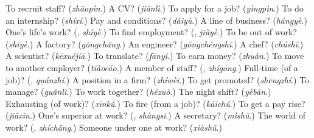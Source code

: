 \begin{tcolorbox}[breakable,colback=teal!4,colframe=teal!35!black,title={Before you move on}]
To recruit staff? (\emph{zhāopìn}.) A CV? (\emph{jiǎnlì}.) To apply for a job? (\emph{yìngpìn}.) To do an internship? (\emph{shíxí}.) Pay and conditions? (\emph{dàiyù}.) A line of business? (\emph{hángyè}.) One's life's work? (\textbf{}, \emph{shìyè}.) To find employment? (\textbf{}, \emph{jiùyè}.) To be out of work? (\emph{shīyè}.) A factory? (\emph{gōngchǎng}.) An engineer? (\emph{gōngchéngshī}.) A chef? (\emph{chúshī}.) A scientist? (\emph{kēxuéjiā}.) To translate? (\emph{fānyì}.) To earn money? (\emph{zhuàn}.) To move to another employer? (\emph{tiàocáo}.) A member of staff? (\textbf{}, \emph{zhígōng}.) Full-time (of a job)? (\textbf{}, \emph{quánzhí}.) A position in a firm? (\emph{zhíwèi}.) To get promoted? (\emph{shēngzhí}.) To manage? (\emph{guǎnlǐ}.) To work together? (\emph{hézuò}.) The night shift? (\emph{yèbān}.) Exhausting (of work)? (\emph{xīnkǔ}.) To fire (from a job)? (\emph{kāichú}.) To get a pay rise? (\emph{jiāxīn}.) One's superior at work? (\textbf{}, \emph{shàngsi}.) A secretary? (\emph{mìshū}.) The world of work? (\textbf{}, \emph{zhíchǎng}.) Someone under one at work? (\emph{xiàshǔ}.)
\end{tcolorbox}
